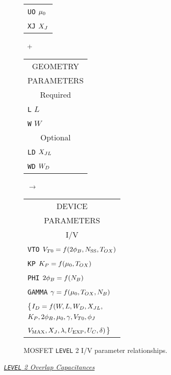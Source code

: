 {{\begin{figure}
\begin{tabular}[t]{|p{1in}|}
{\tt UO} \hfill $\mu_0$\\
{\tt XJ} \hfill $X_J$\\
\hline
\end{tabular}
\hfill
\parbox{0.1in}{\ \vspace*{0.2in}\newline +}
\hfill
\begin{tabular}[t]{|p{1in}|}
\hline
\multicolumn{1}{|c|}{GEOMETRY} \\
\multicolumn{1}{|c|}{PARAMETERS} \\
\hline
\hline
\multicolumn{1}{|c|}{Required} \\
\hline
{\tt L} \hfill $L$\\
{\tt W} \hfill $W$ \\
\hline
\hline
\multicolumn{1}{|c|}{Optional} \\
\hline
{\tt LD} \hfill $X_{JL}$\\
{\tt WD} \hfill $W_D$ \\
\hline
\end{tabular}
\hfill
\parbox{0.1in}{\ \vspace*{0.2in}\newline $\rightarrow$}
\hfill
\begin{tabular}[t]{|p{1.8in}|}
\hline
\multicolumn{1}{|c|}{DEVICE} \\
\multicolumn{1}{|c|}{PARAMETERS} \\
\hline
\hline
\multicolumn{1}{|c|}{I/V}\\
\hline
{\tt VTO} \hfill $V_{T0} = f(2\phi_B, N_{\mbox{\scriptsize SS}}, T_{OX})$\\
{\tt KP} \hfill $K_P = f(\mu_0, T_{OX})$\\
{\tt PHI} \hfill $2\phi_B = f(N_B)$\\
{\tt GAMMA} \hfill $\gamma = f(\mu_0, T_{OX}, N_B)$\\
\hspace*{\fill}\{$I_{D} = f(W, L, W_D, X_{JL},$\\
\hspace*{\fill}$K_P, 2\phi_B, \mu_0, \gamma, V_{T0}, \phi_J$\\
\hspace*{\fill}$V_{\mbox{\scriptsize MAX}}, X_J, \lambda, U_{\mbox{\scriptsize EXP}}, U_C, \delta)$\}\\
\hline
\end{tabular}
\caption{ MOSFET {\tt LEVEL} 2 I/V parameter relationships.
\label{mlevel2iv}}
\end{figure}}
\vshift
\noindent\underline{\sl \large {\tt LEVEL} 2 Overlap Capacitances}\\[0.1in]
}
